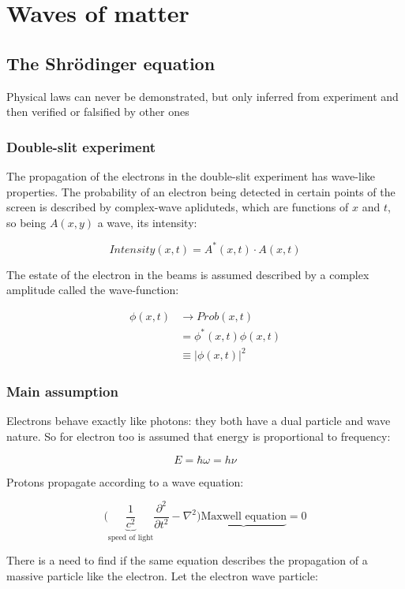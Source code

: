 \chapter{Waves of matter}

\section{The Shr\"odinger equation}
Physical laws can never be demonstrated, but only inferred from experiment and then verified or falsified by other ones


  \subsection{Double-slit experiment}
  The propagation of the electrons in the double-slit experiment has wave-like properties.
  The probability of an electron being detected in certain points of the screen is described by complex-wave apliduteds, which are functions of $x$ and $t$, so being $A(x,y)$ a wave, its intensity:

  $$Intensity(x,t) = A^*(x,t)\cdot A(x,t)$$

  The estate of the electron in the beams is assumed described by a complex amplitude called the wave-function:

  \begin{align*}
    \phi(x,t) &\rightarrow Prob(x,t)\\
              &=\phi^*(x,t)\phi(x,t)\\
              &\equiv |\phi(x,t)|^2
  \end{align*}

  \subsection{Main assumption}
  Electrons behave exactly like photons: they both have a dual particle and wave nature.
  So for electron too is assumed that energy is proportional to frequency:

  $$E = \hbar\omega = h\nu$$

  Protons propagate according to a wave equation:

  $$\biggl(\underbrace{\frac{1}{c^2}}_{\text{speed of light}}\frac{\partial^2{}}{\partial{t^2}} - \nabla^2\biggr)\underbrace{\text{Maxwell equation}} = 0$$

  There is a need to find if the same equation describes the propagation of a massive particle like the electron.
  Let the electron wave particle:

